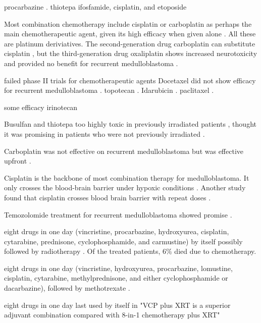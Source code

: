 procarbazine .
thiotepa 
ifosfamide, cisplatin, and etoposide 

Most combination chemotherapy include cisplatin or carboplatin as perhaps the main chemotherapeutic agent, given its high efficacy when given alone . All these are platinum deriviatives. The second-generation drug carboplatin can substitute cisplatin , but the third-generation drug oxaliplatin shows increased neurotoxicity  and provided no benefit for recurrent medulloblastoma .

failed phase II trials for chemotherapeutic agents
Docetaxel did not show efficacy for recurrent medulloblastoma .
topotecan .
Idarubicin .
paclitaxel .

some efficacy
irinotecan 

Busulfan and thiotepa too highly toxic in previously irradiated patients , thought it was promising in patients who were not previously irradiated .

Carboplatin was not effective on recurrent medulloblastoma  but was effective upfront .


Cisplatin is the backbone of most combination therapy for medulloblastoma. It only crosses the blood-brain barrier under hypoxic conditions . Another study found that cisplatin crosses blood brain barrier with repeat doses .


Temozolomide treatment for recurrent medulloblastoma showed promise .

eight drugs in one day (vincristine, procarbazine, hydroxyurea, cisplatin, cytarabine, prednisone, cyclophosphamide, and carmustine) by itself possibly followed by radiotherapy . Of the treated patients, 6\% died due to chemotherapy.

eight drugs in one day (vincristine, hydroxyurea, procarbazine, lomustine, cisplatin, cytarabine, methylprednisone, and either cyclophosphamide or dacarbazine), followed by methotrexate .

eight drugs in one day last used by itself in 
"VCP plus XRT is a superior adjuvant combination compared with 8-in-1 chemotherapy plus XRT"

